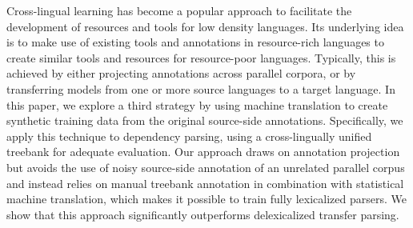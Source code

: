 Cross-lingual learning has become a popular approach to facilitate the development of resources and tools for low density languages. Its underlying idea is to make use of existing tools and annotations in resource-rich languages to create similar tools and resources for resource-poor languages. Typically, this is achieved by either projecting annotations across parallel corpora, or by transferring models from one or more source languages to a target language.  In this paper, we explore a third strategy by using machine translation to create synthetic training data from the original source-side annotations.  Specifically, we apply this technique to dependency parsing, using a cross-lingually unified treebank for adequate evaluation. Our approach draws on annotation projection but avoids the use of noisy source-side annotation of an unrelated parallel corpus and instead relies on manual treebank annotation in combination with statistical machine translation, which makes it possible to train fully lexicalized parsers.  We show that this approach significantly outperforms delexicalized transfer parsing.
